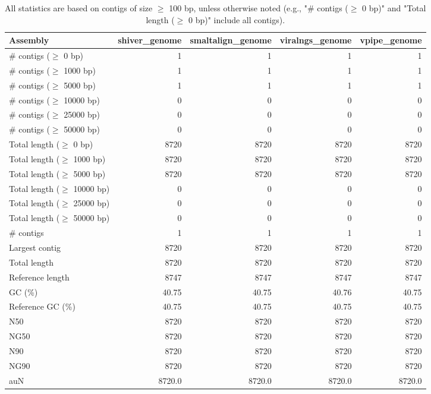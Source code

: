 \documentclass[12pt,a4paper]{article}
\begin{document}
\begin{table}[ht]
\begin{center}
\caption{All statistics are based on contigs of size $\geq$ 100 bp, unless otherwise noted (e.g., "\# contigs ($\geq$ 0 bp)" and "Total length ($\geq$ 0 bp)" include all contigs).}
\begin{tabular}{|l*{4}{|r}|}
\hline
Assembly & shiver\_genome & smaltalign\_genome & viralngs\_genome & vpipe\_genome \\ \hline
\# contigs ($\geq$ 0 bp) & 1 & 1 & 1 & 1 \\ \hline
\# contigs ($\geq$ 1000 bp) & 1 & 1 & 1 & 1 \\ \hline
\# contigs ($\geq$ 5000 bp) & 1 & 1 & 1 & 1 \\ \hline
\# contigs ($\geq$ 10000 bp) & 0 & 0 & 0 & 0 \\ \hline
\# contigs ($\geq$ 25000 bp) & 0 & 0 & 0 & 0 \\ \hline
\# contigs ($\geq$ 50000 bp) & 0 & 0 & 0 & 0 \\ \hline
Total length ($\geq$ 0 bp) & 8720 & 8720 & 8720 & 8720 \\ \hline
Total length ($\geq$ 1000 bp) & 8720 & 8720 & 8720 & 8720 \\ \hline
Total length ($\geq$ 5000 bp) & 8720 & 8720 & 8720 & 8720 \\ \hline
Total length ($\geq$ 10000 bp) & 0 & 0 & 0 & 0 \\ \hline
Total length ($\geq$ 25000 bp) & 0 & 0 & 0 & 0 \\ \hline
Total length ($\geq$ 50000 bp) & 0 & 0 & 0 & 0 \\ \hline
\# contigs & 1 & 1 & 1 & 1 \\ \hline
Largest contig & 8720 & 8720 & 8720 & 8720 \\ \hline
Total length & 8720 & 8720 & 8720 & 8720 \\ \hline
Reference length & 8747 & 8747 & 8747 & 8747 \\ \hline
GC (\%) & 40.75 & 40.75 & 40.76 & 40.75 \\ \hline
Reference GC (\%) & 40.75 & 40.75 & 40.75 & 40.75 \\ \hline
N50 & 8720 & 8720 & 8720 & 8720 \\ \hline
NG50 & 8720 & 8720 & 8720 & 8720 \\ \hline
N90 & 8720 & 8720 & 8720 & 8720 \\ \hline
NG90 & 8720 & 8720 & 8720 & 8720 \\ \hline
auN & 8720.0 & 8720.0 & 8720.0 & 8720.0 \\ \hline

\end{tabular}
\end{center}
\end{table}
\end{document}

